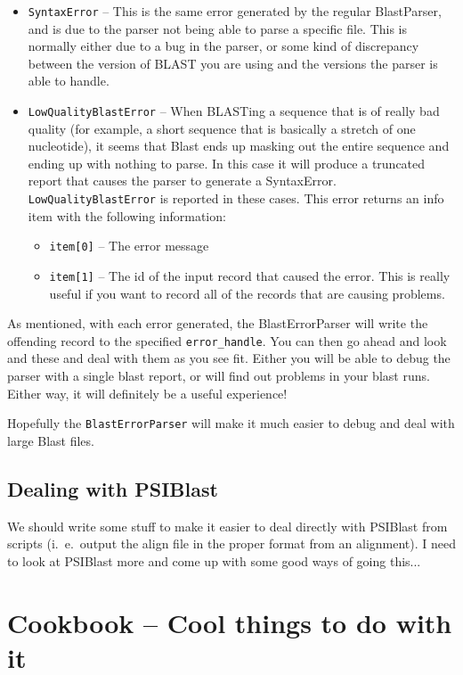 \documentclass{report}
\begin{document}
\begin{itemize}
  \item \verb|SyntaxError| -- This is the same error generated by the regular BlastParser, and is due to the parser not being able to parse a specific file. This is normally either due to a bug in the parser, or some kind of discrepancy between the version of BLAST you are using and the versions the parser is able to handle.

  \item \verb|LowQualityBlastError| -- When BLASTing a sequence that is of really bad quality (for example, a short sequence that is basically a stretch of one nucleotide), it seems that Blast ends up masking out the entire sequence and ending up with nothing to parse. In this case it will produce a truncated report that causes the parser to generate a SyntaxError. \verb|LowQualityBlastError| is reported in these cases. This error returns an info item with the following information:
  \begin{itemize}
    \item \verb|item[0]| -- The error message
    \item \verb|item[1]| -- The id of the input record that caused the error. This is really useful if you want to record all of the records that are causing problems.
  \end{itemize}
\end{itemize}

As mentioned, with each error generated, the BlastErrorParser will write the offending record to the specified \verb|error_handle|. You can then go ahead and look and these and deal with them as you see fit. Either you will be able to debug the parser with a single blast report, or will find out problems in your blast runs. Either way, it will definitely be a useful experience!


Hopefully the \verb|BlastErrorParser| will make it much easier to debug and deal with large Blast files.

\section{Dealing with PSIBlast}

We should write some stuff to make it easier to deal directly with PSIBlast from scripts (i.~e.~output the align file in the proper format from an alignment). I need to look at PSIBlast more and come up with some good ways of going this...

\chapter{Cookbook -- Cool things to do with it}
\label{sec:cookbook}
\end{document}
